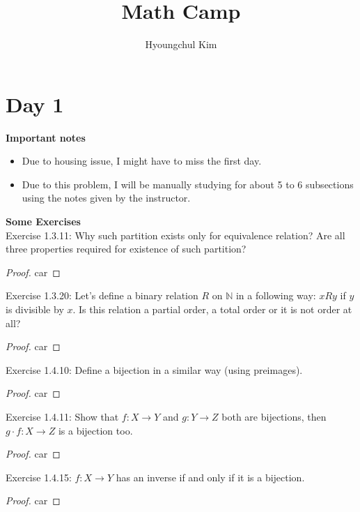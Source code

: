 \documentclass[a4paper]{article}
\title{Math Camp}
\author{Hyoungchul Kim}
\newcommand{\N}{\mathbb{N}}
\begin{document}
\maketitle
	

\section{Day 1}

\textbf{Important notes}

\begin{itemize}
	\item Due to housing issue, I might have to miss the first day.
	\item Due to this problem, I will be manually studying for about 5 to 6 subsections using the notes given by the instructor.
\end{itemize}

\noindent \textbf{Some Exercises}\\

\noindent Exercise 1.3.11: Why such partition exists only for equivalence relation? Are all three properties required for existence of such partition?

\begin{proof}
	car
\end{proof}

\noindent Exercise 1.3.20: Let's define a binary relation $R$ on $\N$ in a following way: $xR y$ if $y$ is divisible by $x$. Is this relation a partial order, a total order or it is not order at all?

\begin{proof}
	car
\end{proof}

\noindent Exercise 1.4.10: Define a bijection in a similar way (using preimages). 

\begin{proof}
	car
\end{proof}

\noindent Exercise 1.4.11: Show that $f: X \to Y$ and $g: Y \to Z$ both are bijections, then $g \cdot f: X \to Z$ is a bijection too.

\begin{proof}
	car
\end{proof}

\noindent Exercise 1.4.15: $f: X \to Y$  has an inverse if and only if it is a bijection.

\begin{proof}
	car
\end{proof}
\end{document}
